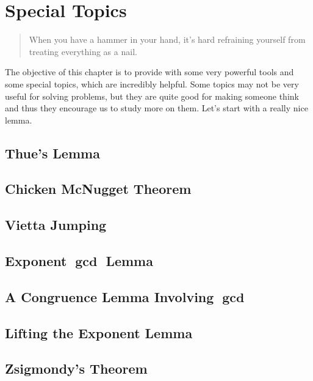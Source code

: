 \documentclass{subfile}
\begin{document}
	\chapter{Special Topics}\label{ch:special}
	
	\begin{quote}\ttfamily
		When you have a hammer in your hand, it's hard refraining yourself from treating everything as a nail.
	\end{quote}
	The objective of this chapter is to provide with some very powerful tools and some special topics, which are incredibly helpful. Some topics may not be very useful for solving problems, but they are quite good for making someone think and thus they encourage us to study more on them. Let's start with a really nice lemma\watermark.
	
	\section{Thue's Lemma}
	
	
	\section{Chicken McNugget Theorem}
	
	
	\section{Vietta Jumping}
	
	
	\section{Exponent \texorpdfstring{$\boldsymbol{\gcd}$}{gcd} Lemma}
	
	
	\section{A Congruence Lemma Involving \texorpdfstring{$\boldsymbol{\gcd}$}{gcd}}
	
	
	\section{Lifting the Exponent Lemma}
	
	
	\section{Zsigmondy's Theorem}
\end{document}
